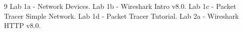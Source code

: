 \section{\sectionreferencestitle}
\begin{thebibliography}{9}
     Lab 1a - Network Devices.
     Lab 1b - Wireshark Intro v8.0.
     Lab 1c - Packet Tracer Simple Network.
     Lab 1d - Packet Tracer Tutorial.
     Lab 2a - Wireshark HTTP v8.0.
\end{thebibliography}
